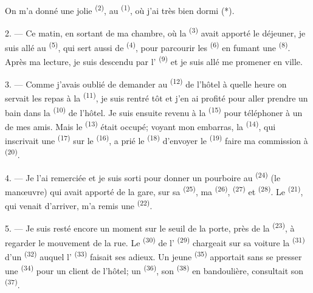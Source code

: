 On m'a donné une jolie  \textsuperscript{(2)}, au
 \textsuperscript{(1)}, où j'ai très bien dormi (*).

2. --- Ce matin, en sortant de ma chambre, où la 
\textsuperscript{(3)} avait apporté le déjeuner, je suis allé au
 \textsuperscript{(5)}, qui sert aussi de  \textsuperscript{(4)}, pour parcourir les 
\textsuperscript{(6)} en fumant une  \textsuperscript{(8)}.
Après ma lecture, je suis descendu par l'
\textsuperscript{(9)} et je suis allé me promener en ville.

3. --- Comme j'avais oublié de demander au 
\textsuperscript{(12)} de l'hôtel à quelle heure on servait les repas à la
\textsuperscript{(11)}, je suis rentré tôt et
j'en ai profité pour aller prendre un bain dans la 
\textsuperscript{(10)} de l'hôtel. Je suis ensuite revenu à la 
\textsuperscript{(15)} pour téléphoner à un de mes amis. Mais le
 \textsuperscript{(13)} était occupé; voyant mon embarras, la
 \textsuperscript{(14)}, qui inscrivait une 
\textsuperscript{(17)} sur le 
\textsuperscript{(16)}, a prié le  \textsuperscript{(18)}
d'envoyer le  \textsuperscript{(19)} faire ma commission à
 \textsuperscript{(20)}.

4. --- Je l'ai remerciée et je suis sorti pour donner un pourboire au
 \textsuperscript{(24)} (le manœuvre) qui avait apporté de la
gare, sur sa  \textsuperscript{(25)}, ma  \textsuperscript{(26)},  \textsuperscript{(27)} et
 \textsuperscript{(28)}. Le 
\textsuperscript{(21)}, qui venait d'arriver, m'a remis une 
\textsuperscript{(22)}.

5. --- Je suis resté encore un moment sur le seuil de la porte, près de la
 \textsuperscript{(23)}, à regarder le mouvement de la
rue. Le  \textsuperscript{(30)} de l'
\textsuperscript{(29)} chargeait sur sa voiture la 
\textsuperscript{(31)} d'un  \textsuperscript{(32)} auquel
l' \textsuperscript{(33)} faisait ses adieux. Un jeune
 \textsuperscript{(35)} apportait sans se presser une
 \textsuperscript{(34)} pour un client de l'hôtel; un
 \textsuperscript{(36)}, son 
\textsuperscript{(38)} en bandoulière, consultait son 
\textsuperscript{(37)}.

